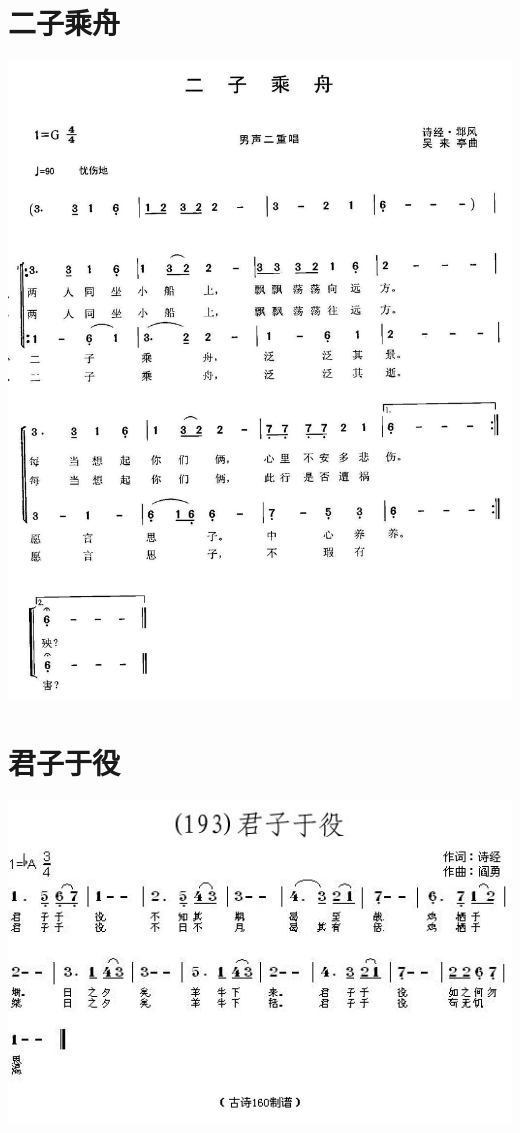 \documentclass[cn,pad,twocol]{elegantbook}
\begin{document}
\section{二子乘舟}  \includegraphics[width=\textwidth]{rpi400/20210123-二子乘舟.jpg}
\section{君子于役}  \includegraphics[width=\textwidth]{rpi400/20210123-君子于役.jpg}
\end{document}
